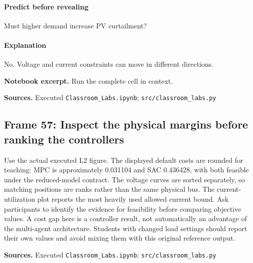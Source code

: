 \documentclass[11pt]{article}
\begin{document}
\paragraph{Predict before revealing}Must higher demand increase PV curtailment?
\paragraph{Explanation}No. Voltage and current constraints can move in different directions.
\par\noindent\begin{minipage}{\linewidth}\textbf{Notebook excerpt.} Run the complete cell in context.\par \end{minipage}\par
\par\nopagebreak\begin{minipage}{\linewidth}{\footnotesize\color{slate}\textbf{Sources.} Executed \texttt{Classroom\_Labs.ipynb}; \texttt{src/classroom\_labs.py}\par}\end{minipage}\par\medskip
\subsection*{Frame 57: Inspect the physical margins before ranking the controllers}
Use the actual executed L2 figure. The displayed default costs are rounded for teaching: MPC is approximately 0.031104 and SAC 0.436428, with both feasible under the reduced-model contract. The voltage curves are sorted separately, so matching positions are ranks rather than the same physical bus. The current-utilization plot reports the most heavily used allowed current bound. Ask participants to identify the evidence for feasibility before comparing objective values. A cost gap here is a controller result, not automatically an advantage of the multi-agent architecture. Students with changed load settings should report their own values and avoid mixing them with this original reference output.\par
\par\nopagebreak\begin{minipage}{\linewidth}{\footnotesize\color{slate}\textbf{Sources.} Executed \texttt{Classroom\_Labs.ipynb}; \texttt{src/classroom\_labs.py}\par}\end{minipage}\par\medskip
\end{document}
